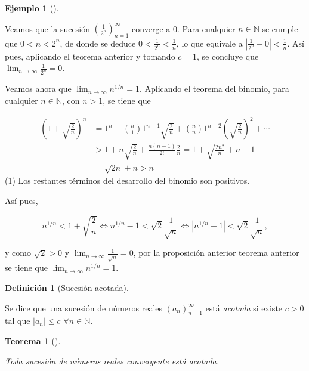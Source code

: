 \documentclass[
  a4paper,
]{scrreport}
\theoremstyle{definition}
\newtheorem{definition}{Definición}[chapter]
\theoremstyle{plain}
\newtheorem{theorem}{Teorema}[chapter]
\theoremstyle{plain}
\theoremstyle{definition}
\theoremstyle{definition}
\newtheorem{example}{Ejemplo}[chapter]
\theoremstyle{plain}
\theoremstyle{remark}
\begin{document}
\begin{example}[]\protect\hypertarget{exm-convergencia-sucesion-acotada}{}\label{exm-convergencia-sucesion-acotada}

Veamos que la sucesión \(\left(\frac{1}{2^n}\right)_{n=1}^\infty\)
converge a 0. Para cualquier \(n\in\mathbb{N}\) se cumple que
\(0<n<2^n\), de donde se deduce \(0<\frac{1}{2^n}<\frac{1}{n}\), lo que
equivale a \(|\frac{1}{2^n}-0|<\frac{1}{n}\). Así pues, aplicando el
teorema anterior y tomando \(c=1\), se concluye que
\(\lim_{n\to\infty}\frac{1}{2^n}=0\).

Veamos ahora que \(\lim_{n\to\infty}n^{1/n}=1\). Aplicando el teorema
del binomio, para cualquier \(n\in\mathbb{N}\), con \(n>1\), se tiene
que

\begin{align*}
(1+\sqrt{\frac{2}{n}})^n 
&= 1^n + \binom{n}{1}1^{n-1}\sqrt{\frac{2}{n}} + \binom{n}{n}1^{n-2}\left(\sqrt{\frac{2}{n}}\right)^2 + \cdots \tag{1} \\
& > 1 + n\sqrt{\frac{2}{n}} + \frac{n(n-1)}{2!}\frac{2}{n}
= 1 + \sqrt{\frac{2n^2}{n}} + n -1 \\
&= \sqrt{2n} + n
> n 
\end{align*} (1) Los restantes términos del desarrollo del binomio son
positivos.

Así pues,

\[
n^{1/n} < 1+\sqrt{\frac{2}{n}} 
\Leftrightarrow n^{1/n} - 1 < \sqrt{2}{\frac{1}{\sqrt{n}}} 
\Leftrightarrow |n^{1/n} - 1| < \sqrt{2}\frac{1}{\sqrt{n}},
\]

y como \(\sqrt{2}>0\) y \(\lim_{n\to\infty}\frac{1}{\sqrt{n}}=0\), por
la proposición anterior teorema anterior se tiene que
\(\lim_{n\to\infty} n^{1/n} = 1\).

\end{example}

\begin{definition}[Sucesión
acotada]\protect\hypertarget{def-sucesion-acotada}{}\label{def-sucesion-acotada}

Se dice que una sucesión de números reales \((a_n)_{n=1}^\infty\) está
\emph{acotada} si existe \(c>0\) tal que \(|a_n|\leq c\)
\(\forall n\in\mathbb{N}\).

\end{definition}

\begin{theorem}[]\protect\hypertarget{thm-convergencia-sucesion-acotada}{}\label{thm-convergencia-sucesion-acotada}

Toda sucesión de números reales convergente está acotada.

\end{theorem}
\end{document}
